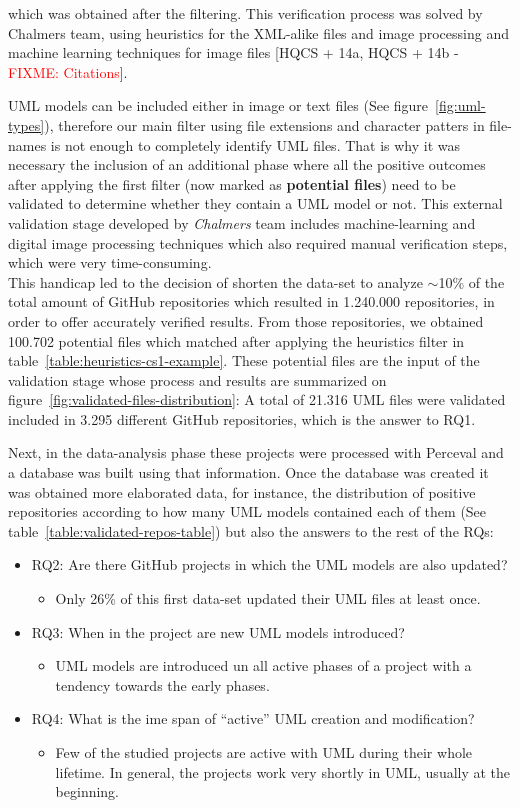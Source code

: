 \documentclass[a4paper, 12pt]{book}
\begin{document}
which was obtained after the filtering. This verification process was solved by Chalmers team, using heuristics for the XML-alike files
and image processing and machine learning techniques for image files [HQCS + 14a, HQCS + 14b - \textcolor{red}{FIXME: Citations}].\par
UML models can be included either in image or text files (See figure~\ref{fig:uml-types}), therefore our main filter using file extensions
and character patters in file-names is not enough to completely identify UML files. That is why it was necessary the inclusion of
an additional phase where all the positive outcomes after applying the first filter (now marked as \textbf{potential files}) need
to be validated to determine whether they contain a UML model or not. This external validation stage developed by \emph{Chalmers} team
includes machine-learning and digital image processing techniques which also required manual verification steps, which were very time-consuming.\\
This handicap led to the decision of shorten the data-set to analyze $\sim$10\% of the total amount of GitHub repositories which resulted
in 1.240.000 repositories, in order to offer accurately verified results. From those repositories, we obtained 100.702 potential files
which matched after applying the heuristics filter in table~\ref{table:heuristics-cs1-example}. These potential files are the input
of the validation stage whose process and results are summarized on figure~\ref{fig:validated-files-distribution}: A total of 21.316 UML
files were validated included in 3.295 different GitHub repositories, which is the answer to RQ1.\par
Next, in the data-analysis phase these projects were processed with Perceval and a database was built using that information.
Once the database was created it was obtained more elaborated data, for instance, the distribution of positive repositories
according to how many UML models contained each of them (See table~\ref{table:validated-repos-table}) but also the answers to the rest
of the RQs:
\begin{itemize}
  \item RQ2: Are there GitHub projects in which the UML models are also updated?
  \begin{itemize}
    \item Only 26\% of this first data-set updated their UML files at least once.
  \end{itemize}
  \item RQ3: When in the project are new UML models introduced?
  \begin{itemize}
    \item UML models are introduced un all active phases of a project with a tendency towards the early phases.
  \end{itemize}
  \item RQ4: What is the ime span of ``active'' UML creation and modification?
  \begin{itemize}
    \item Few of the studied projects are active with UML during their whole lifetime.
    In general, the projects work very shortly in UML, usually at the beginning.
  \end{itemize}
\end{itemize}
\end{document}
